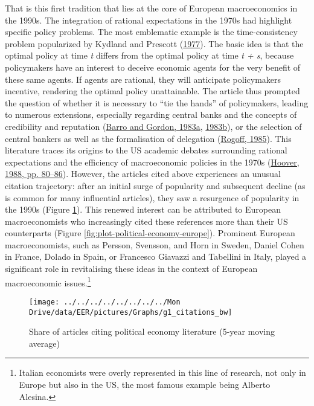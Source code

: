 \documentclass[
  12pt,
  onecolumn]{article}
\begin{document}
That is this first tradition that lies at the core of European
macroeconomics in the 1990s. The integration of rational expectations in
the 1970s had highlight specific policy problems. The most emblematic
example is the time-consistency problem popularized by Kydland and
Prescott (\protect\hyperlink{ref-kydland1977}{1977}). The basic idea is
that the optimal policy at time \emph{t} differs from the optimal policy
at time \emph{t + s}, because policymakers have an interest to deceive
economic agents for the very benefit of these same agents. If agents are
rational, they will anticipate policymakers incentive, rendering the
optimal policy unattainable. The article thus prompted the question of
whether it is necessary to ``tie the hands'' of policymakers, leading to
numerous extensions, especially regarding central banks and the concepts
of credibility and reputation (\protect\hyperlink{ref-barro1983}{Barro
and Gordon, 1983a}, \protect\hyperlink{ref-barro1983c}{1983b}), or the
selection of central bankers as well as the formalisation of delegation
(\protect\hyperlink{ref-rogoff1985b}{Rogoff, 1985}). This literature
traces its origins to the US academic debates surrounding rational
expectations and the efficiency of macroeconomic policies in the 1970s
(\protect\hyperlink{ref-hoover1988}{Hoover, 1988, pp. 80--86}). However,
the articles cited above experiences an unusual citation trajectory:
after an initial surge of popularity and subsequent decline (as is
common for many influential articles), they saw a resurgence of
popularity in the 1990s (Figure \ref{fig:plot-political-economy}). This
renewed interest can be attributed to European macroeconomists who
increasingly cited these references more than their US counterparts
(Figure \ref{fig:plot-political-economy-europe}). Prominent European
macroeconomists, such as Persson, Svensson, and Horn in Sweden, Daniel
Cohen in France, Dolado in Spain, or Francesco Giavazzi and Tabellini in
Italy, played a significant role in revitalising these ideas in the
context of European macroeconomic issues.\footnote{Italian economists
  were overly represented in this line of research, not only in Europe
  but also in the US, the most famous example being Alberto Alesina.}

\begin{figure}[H]

{\centering \texttt{[image: ../../../../../../../../Mon Drive/data/EER/pictures/Graphs/g1\_citations\_bw]} 

}

\caption{Share of articles citing political economy literature (5-year moving average)}\label{fig:plot-political-economy}
\end{figure}
\end{document}
